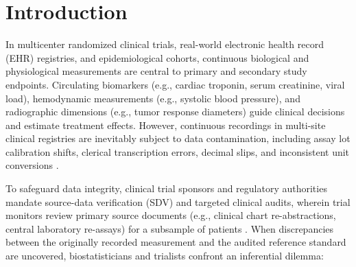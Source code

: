 \documentclass[
]{article}
\begin{document}
\section{Introduction}\label{introduction}

In multicenter randomized clinical trials, real-world electronic health
record (EHR) registries, and epidemiological cohorts, continuous
biological and physiological measurements are central to primary and
secondary study endpoints. Circulating biomarkers (e.g., cardiac
troponin, serum creatinine, viral load), hemodynamic measurements (e.g.,
systolic blood pressure), and radiographic dimensions (e.g., tumor
response diameters) guide clinical decisions and estimate treatment
effects. However, continuous recordings in multi-site clinical
registries are inevitably subject to data contamination, including assay
lot calibration shifts, clerical transcription errors, decimal slips,
and inconsistent unit conversions
\citep{carroll2006measurement, angelopoulos2023prediction}.

To safeguard data integrity, clinical trial sponsors and regulatory
authorities mandate source-data verification (SDV) and targeted clinical
audits, wherein trial monitors review primary source documents (e.g.,
clinical chart re-abstractions, central laboratory re-assays) for a
subsample of patients \citep{fda2003part11, ich1998e9}. When
discrepancies between the originally recorded measurement and the
audited reference standard are uncovered, biostatisticians and trialists
confront an inferential dilemma:
\end{document}
